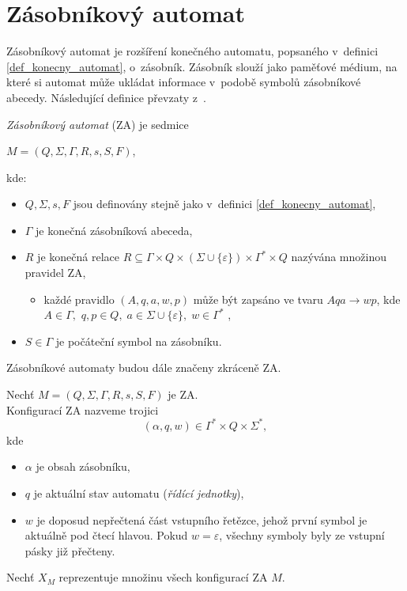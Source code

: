 \section{Zásobníkový automat}\label{kap_zasobnikovy_automat}
Zásobníkový automat je rozšíření konečného automatu, popsaného v~definici \ref{def_konecny_automat}, o~zásobník.
Zásobník slouží jako paměťové médium, na které si automat může ukládat informace v~podobě symbolů zásobníkové abecedy.
Následující definice převzaty z~\cite{meduna2023automata, TIN-opora}.
\begin{definition}\label{def_zasobnikovy_automat}
    \emph{Zásobníkový automat} (ZA) je sedmice 
    \begin{center}
        $M = (Q, \Sigma, \Gamma, R, s, S, F)$,
    \end{center}
    kde:
    \begin{itemize}
        \item $Q, \Sigma, s, F$ jsou definovány stejně jako v~definici \ref{def_konecny_automat},
        \item $\Gamma$ je konečná zásobníková abeceda,
        \item $R$ je konečná relace $R \subseteq \Gamma \times Q \times (\Sigma \cup \{\varepsilon\}) \times \Gamma^* \times Q$ nazývána množinou pravidel ZA,
        \begin{itemize}[label=$\circ$]
            \item každé pravidlo $(A, q, a, w, p)$ může být zapsáno ve tvaru $Aqa \rightarrow wp$, kde $A \in \Gamma,$ $q, p \in Q,\; a \in \Sigma \cup \{\varepsilon\},\; w \in \Gamma^*$ \cite{meduna2017modely},
        \end{itemize}  
        \item $S \in \Gamma$ je počáteční symbol na zásobníku.
    \end{itemize}
\end{definition}

\begin{convention}
    Zásobníkové automaty budou dále značeny zkráceně ZA.
\end{convention}

\begin{definition}\label{def_konfigurace_za}
    Nechť $M = (Q, \Sigma, \Gamma, R, s, S, F)$ je ZA.\\
    Konfigurací ZA nazveme trojici
    \begin{equation*}
        (\alpha, q, w) \in \Gamma^* \times Q \times \Sigma^*, 
    \end{equation*}
    kde
    \begin{itemize}
        \item $\alpha$ je obsah zásobníku,
        \item $q$ je aktuální stav automatu (\emph{řídící jednotky}),
        \item $w$ je doposud nepřečtená část vstupního řetězce, jehož první symbol je aktuálně pod čtecí hlavou.
        Pokud $w = \varepsilon$, všechny symboly byly ze vstupní pásky již přečteny.
    \end{itemize}
    Nechť $X_M$ reprezentuje množinu všech konfigurací ZA $M$.
\end{definition}

